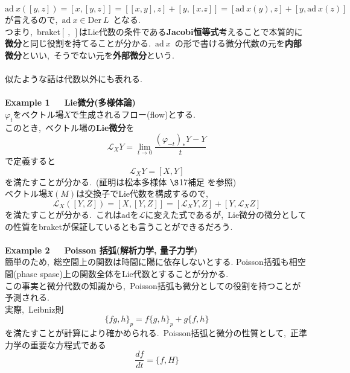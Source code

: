 \documentclass[uplatex,dvipdfmx]{jsarticle}
\begin{document}
\begin{equation*}
    \text{ad} ~x([y,z]) =[x,[y,z]]=[[x,y],z]+[y,[x.z]]=[\text{ad}~x(y),z]+[y,\text{ad}~x(z)]
\end{equation*}
が言えるので,~$\text{ad}~x\in \text{Der}~L$~となる.\\
つまり,~braket$[~,~]$はLie代数の条件である\textbf{Jacobi恒等式}考えることで本質的に\textbf{微分}と同じ役割を持てることが分かる.~$\text{ad}~x$~の形で書ける微分代数の元を\textbf{内部微分}といい,~そうでない元を\textbf{外部微分}という.\\\\
似たような話は代数以外にも表れる.\\\\
\textbf{Example 1~~~Lie微分(多様体論)}\\
$\varphi_t$をベクトル場$X$で生成されるフロー(flow)とする.\\
このとき,~ベクトル場の\textbf{Lie微分}を
\begin{equation*}
    \mathcal{L}_X Y=\lim_{t\to 0} \frac{(\varphi_{-t})_*Y -Y}{t}
\end{equation*}
で定義すると
\begin{equation*}
    \mathcal{L}_XY = [X,Y]
\end{equation*}
を満たすことが分かる.~(証明は松本多様体 $\S$17補足 を参照)\\
ベクトル場$\mathfrak{X}(M)$は交換子でLie代数を構成するので,~
\begin{equation*}
    \mathcal{L}_X([Y,Z])=[X,[Y,Z]]=[\mathcal{L}_XY,Z]+[Y,\mathcal{L}_X Z]
\end{equation*}
を満たすことが分かる.~これは$\text{ad}$を$\mathcal{L}$に変えた式であるが,~Lie微分の微分としての性質をbraketが保証しているとも言うことができるだろう.\\\\
\textbf{Example 2~~~Poisson 括弧(解析力学, 量子力学)}\\
簡単のため,~総空間上の関数は時間に陽に依存しないとする.
Poisson括弧も相空間(phase spase)上の関数全体をLie代数とすることが分かる.\\
この事実と微分代数の知識から,~Poisson括弧も微分としての役割を持つことが予測される.\\
実際,~Leibniz則
\begin{equation*}
    \{fg,h\}_p = f\{g,h\}_p+g\{f,h\}
\end{equation*}
を満たすことが計算により確かめられる.~Poisson括弧と微分の性質として,~正準力学の重要な方程式である
\begin{equation*}
    \frac{df}{dt}=\{f,H\}
\end{equation*}
\end{document}
